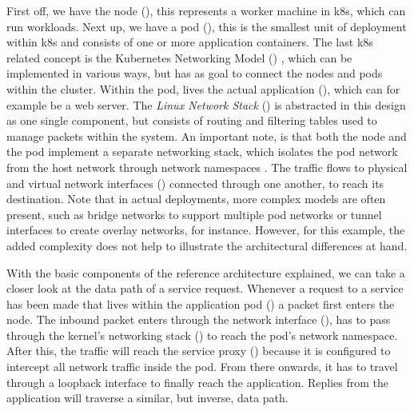 First off, we have the node (), this represents a worker machine in \gls{k8s}, which can run workloads. Next up, we have a \gls{pod} (), this is the smallest unit of deployment within \gls{k8s} and consists of one or more application containers. The last \gls{k8s} related concept is the Kubernetes Networking Model () \cite{kubernetes-cluster-networking}, which can be implemented in various ways, but has as goal to connect the nodes and pods within the cluster. Within the \gls{pod}, lives the actual application (), which can for example be a web server. The \textit{Linux Network Stack} () is abstracted in this design as one single component, but consists of routing and filtering tables used to manage packets within the system. An important note, is that both the node and the \gls{pod} implement a separate networking stack, which isolates the pod network from the host network through network namespaces \cite{man-network-namespaces}. The traffic flows to physical and virtual network interfaces () connected through one another, to reach its destination. Note that in actual deployments, more complex models are often present, such as bridge networks to support multiple pod networks or tunnel interfaces to create overlay networks, for instance. However, for this example, the added complexity does not help to illustrate the architectural differences at hand.


With the basic components of the reference architecture explained, we can take a closer look at the data path of a service request. Whenever a request to a service has been made that lives within the application pod () a packet first enters the node. The inbound packet enters through the network interface (), has to pass through the kernel's networking stack () to reach the \gls{pod}'s network namespace. After this, the traffic will reach the service proxy () because it is configured to intercept all network traffic inside the pod. From there onwards, it has to travel through a loopback interface to finally reach the application. Replies from the application will traverse a similar, but inverse, data path.


